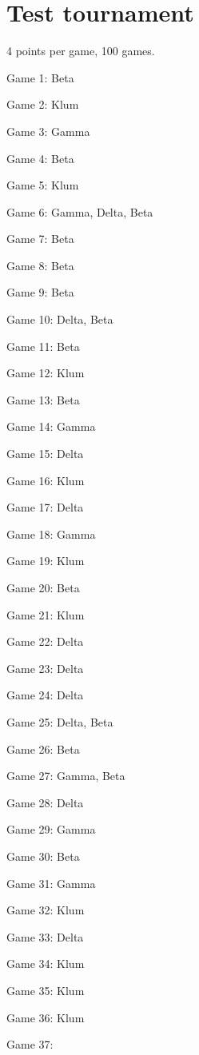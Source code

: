 \documentclass{article}
\begin{document}
\section{Test tournament}
4 points per game, 100 games.
\begin{multicols}{3}\raggedcolumns
\begin{compactitem}
\item Game 1:
Beta
\item Game 2:
Klum
\item Game 3:
Gamma
\item Game 4:
Beta
\item Game 5:
Klum
\item Game 6:
Gamma, Delta, Beta
\item Game 7:
Beta
\item Game 8:
Beta
\item Game 9:
Beta
\item Game 10:
Delta, Beta
\item Game 11:
Beta
\item Game 12:
Klum
\item Game 13:
Beta
\item Game 14:
Gamma
\item Game 15:
Delta
\item Game 16:
Klum
\item Game 17:
Delta
\item Game 18:
Gamma
\item Game 19:
Klum
\item Game 20:
Beta
\item Game 21:
Klum
\item Game 22:
Delta
\item Game 23:
Delta
\item Game 24:
Delta
\item Game 25:
Delta, Beta
\item Game 26:
Beta
\item Game 27:
Gamma, Beta
\item Game 28:
Delta
\item Game 29:
Gamma
\item Game 30:
Beta
\item Game 31:
Gamma
\item Game 32:
Klum
\item Game 33:
Delta
\item Game 34:
Klum
\item Game 35:
Klum
\item Game 36:
Klum
\item Game 37:

\end{compactitem}
\end{multicols}
\end{document}
